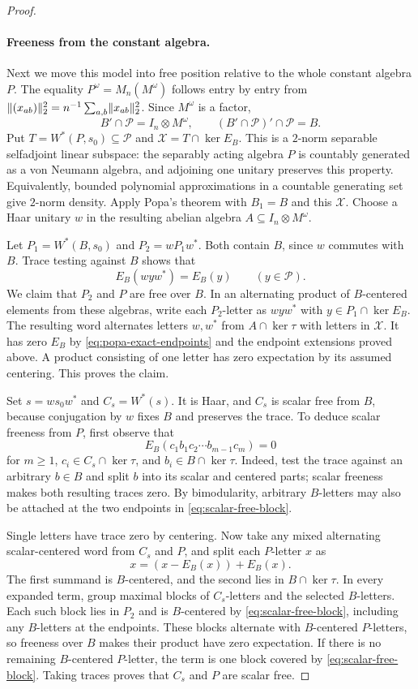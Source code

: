 \begin{proof}
\paragraph{Freeness from the constant algebra.}
Next we move this model into free position relative to the whole
constant algebra $P$.  The equality
$P^\omega=M_n(M^\omega)$ follows entry by entry from
$\lVert(x_{ab})\rVert_2^2=n^{-1}\sum_{a,b}\lVert x_{ab}\rVert_2^2$.
Since $M^\omega$ is a factor,
\[
 B'\cap\mathcal P=I_n\otimes M^\omega,
 \qquad (B'\cap\mathcal P)'\cap\mathcal P=B.
\]
Put $T=W^*(P,s_0)\subseteq\mathcal P$ and
$\mathcal X=T\cap\ker E_B$.  This is a $2$-norm separable
selfadjoint linear subspace: the separably acting algebra $P$ is
countably generated as a von Neumann algebra, and adjoining one
unitary preserves this property.  Equivalently, bounded polynomial
approximations in a countable generating set give $2$-norm density.
Apply Popa's theorem with $B_1=B$ and this $\mathcal X$.
Choose a Haar unitary $w$ in the resulting abelian algebra
$A\subseteq I_n\otimes M^\omega$.

Let $P_1=W^*(B,s_0)$ and $P_2=wP_1w^*$.
Both contain $B$, since $w$ commutes with $B$.  Trace testing against
$B$ shows that
\[
 E_B(wyw^*)=E_B(y)\qquad(y\in\mathcal P).
\]
We claim that $P_2$ and $P$ are free over $B$.  In an alternating
product of $B$-centered elements from these algebras, write each
$P_2$-letter as $wyw^*$ with $y\in P_1\cap\ker E_B$.
The resulting word alternates letters $w,w^*$ from $A\cap\ker\tau$
with letters in $\mathcal X$.  It has zero $E_B$ by
\eqref{eq:popa-exact-endpoints} and the endpoint extensions proved
above.  A product consisting of one letter has zero expectation
by its assumed centering.  This proves the claim.

Set $s=ws_0w^*$ and $C_s=W^*(s)$.
It is Haar, and $C_s$ is scalar free from $B$, because conjugation
by $w$ fixes $B$ and preserves the trace.  To deduce scalar
freeness from $P$, first observe that
\begin{equation}\label{eq:scalar-free-block}
 E_B(c_1b_1c_2\cdots b_{m-1}c_m)=0
\end{equation}
for $m\geq1$, $c_i\in C_s\cap\ker\tau$, and
$b_i\in B\cap\ker\tau$.  Indeed, test the trace against an
arbitrary $b\in B$ and split $b$ into its scalar and centered
parts; scalar freeness makes both resulting traces zero.
By bimodularity, arbitrary $B$-letters may also be attached at the
two endpoints in \eqref{eq:scalar-free-block}.

Single letters have trace zero by centering.  Now take any mixed
alternating scalar-centered word from $C_s$ and $P$,
and split each $P$-letter $x$ as
\[
 x=(x-E_B(x))+E_B(x).
\]
The first summand is $B$-centered, and the second lies in
$B\cap\ker\tau$.  In every expanded term, group maximal blocks
of $C_s$-letters and the selected $B$-letters.  Each such block
lies in $P_2$ and is $B$-centered by
\eqref{eq:scalar-free-block}, including any $B$-letters at the
endpoints.  These blocks alternate with $B$-centered $P$-letters,
so freeness over $B$ makes their product have zero expectation.
If there is no remaining $B$-centered $P$-letter, the term is one
block covered by \eqref{eq:scalar-free-block}.  Taking traces
proves that $C_s$ and $P$ are scalar free.


\end{proof}
